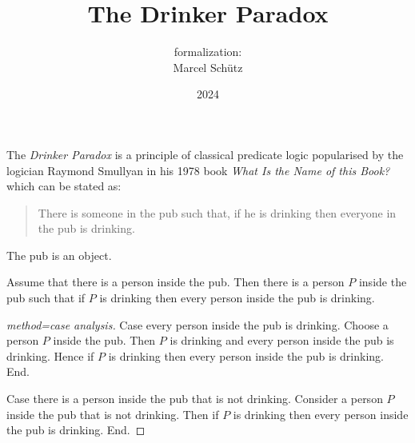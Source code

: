 \documentclass{article}
\title{The Drinker Paradox}
\author{\Naproche formalization:\\[0.5em]Marcel Schütz}
\date{2024}
\begin{document}
  \maketitle


  \noindent The \emph{Drinker Paradox} is a principle of classical predicate 
  logic popularised by the logician Raymond Smullyan in his 1978 book
  \textit{What Is the Name of this Book?} \cite{Smullyan1978} which can be 
  stated as:

  \begin{quotation}
    \noindent There is someone in the pub such that, if he is drinking then 
    everyone in the pub is drinking.
  \end{quotation}

  \begin{forthel}
    \begin{signature*}
      The pub is an object.
    \end{signature*}
    
    \begin{theorem*}[title=Drinker Paradox,id=drinker_paradox]
      Assume that there is a person inside the pub.
      Then there is a person $P$ inside the pub such that if $P$ is drinking then every person inside the pub is drinking.
    \end{theorem*}
    \begin{proof}[method=case analysis]
      Case every person inside the pub is drinking.
        Choose a person $P$ inside the pub.
        Then $P$ is drinking and every person inside the pub is drinking.
        Hence if $P$ is drinking then every person inside the pub is drinking.
      End.
    
      Case there is a person inside the pub that is not drinking.
        Consider a person $P$ inside the pub that is not drinking.
        Then if $P$ is drinking then every person inside the pub is drinking.
      End.
    \end{proof}
  \end{forthel}

  \printbibliography
\end{document}
